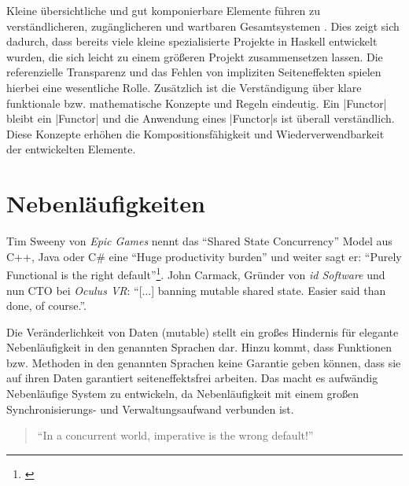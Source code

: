 Kleine übersichtliche und gut komponierbare Elemente führen zu verständlicheren, zugänglicheren und wartbaren Gesamtsystemen \parencite[Seite 12 ff.]{Stewart2015}. Dies zeigt sich dadurch, dass bereits viele kleine spezialisierte Projekte in Haskell entwickelt wurden, die sich leicht zu einem größeren Projekt zusammensetzen lassen. Die referenzielle Transparenz und das Fehlen von impliziten Seiteneffekten spielen hierbei eine wesentliche Rolle. Zusätzlich ist die Verständigung über klare funktionale bzw. mathematische Konzepte und Regeln eindeutig. Ein |Functor| bleibt ein |Functor| und die Anwendung eines |Functor|s ist überall verständlich. Diese Konzepte erhöhen die Kompositionsfähigkeit und Wiederverwendbarkeit der entwickelten Elemente.

\section{Nebenläufigkeiten}
\label{sec:nebenlaeufigkeiten}

Tim Sweeny von \textit{Epic Games} nennt das "`Shared State Concurrency"' Model aus C++, Java oder C\# eine "`Huge productivity burden"' und weiter sagt er: "`Purely Functional is the right default"'\footnote{\cite[Vgl.][Seite 42 u. Seite 56]{Sweeney2006}\label{note:sweeney-mainstream}}. John Carmack, Gründer von \textit{id Software} und nun CTO bei \textit{Oculus VR}: "`[...] banning mutable shared state. Easier said than done, of course."'.

Die Veränderlichkeit von Daten (mutable) stellt ein großes Hindernis für elegante Nebenläufigkeit in den genannten Sprachen dar. Hinzu kommt, dass Funktionen bzw. Methoden in den genannten Sprachen keine Garantie geben können, dass sie auf ihren Daten garantiert seiteneffektsfrei arbeiten. Das macht es aufwändig Nebenläufige System zu entwickeln, da Nebenläufigkeit mit einem großen Synchronisierungs- und Verwaltungsaufwand verbunden ist.

\begin{quote}
"`In a concurrent world, imperative is the wrong default!"'
\end{quote}

